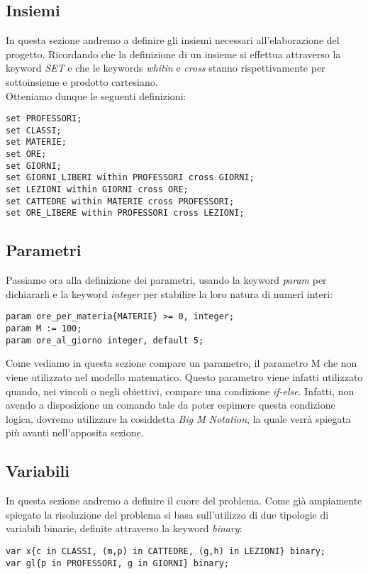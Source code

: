 \documentclass{article}
\begin{document}
\subsection{Insiemi}
In questa sezione andremo a definire gli insiemi necessari all'elaborazione del progetto. Ricordando che la definizione di un insieme si effettua attraverso la keyword \emph{SET} e che le keywords \emph{whitin} e \emph{cross} stanno rispettivamente per sottoinsieme e prodotto cartesiano. 
\\Otteniamo dunque le seguenti definizioni:
\begin{verbatim}
set PROFESSORI;
set CLASSI;
set MATERIE;
set ORE;
set GIORNI;
set GIORNI_LIBERI within PROFESSORI cross GIORNI;
set LEZIONI within GIORNI cross ORE;
set CATTEDRE within MATERIE cross PROFESSORI;
set ORE_LIBERE within PROFESSORI cross LEZIONI;
\end{verbatim}
\subsection{Parametri}
Passiamo ora alla definizione dei parametri, usando la keyword \emph{param} per dichiararli e la keyword \emph{integer} per stabilire la loro natura di numeri interi:
\begin{verbatim}
param ore_per_materia{MATERIE} >= 0, integer;
param M := 100;
param ore_al_giorno integer, default 5;
\end{verbatim}
Come vediamo in questa sezione compare un parametro, il parametro M che non viene utilizzato nel modello matematico. Questo parametro viene infatti utilizzato quando, nei vincoli o negli obiettivi, compare una condizione \emph{if-else}. Infatti, non avendo a disposizione un comando tale da poter espimere questa condizione logica, dovremo utilizzare la cosiddetta \emph{Big M Notation}, la quale verrà spiegata più avanti nell'apposita sezione.

\subsection{Variabili}
In questa sezione andremo a definire il cuore del problema. Come già ampiamente spiegato la risoluzione del problema si basa sull'utilizzo di due tipologie di variabili binarie, definite attraverso la keyword \emph{binary}:
\begin{verbatim}
var x{c in CLASSI, (m,p) in CATTEDRE, (g,h) in LEZIONI} binary;
var gl{p in PROFESSORI, g in GIORNI} binary;
\end{verbatim}
\end{document}
